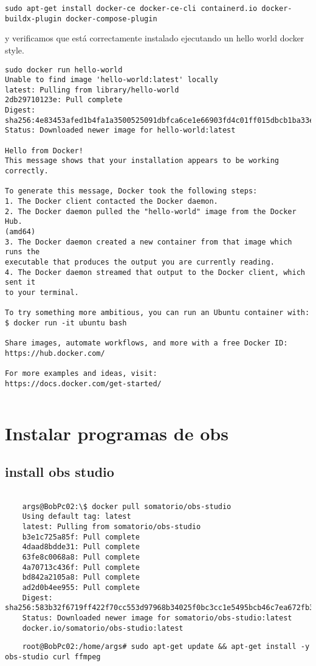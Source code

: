 \documentclass[../main.tex]{subfiles}
\begin{document}
\begin{lstlisting}
sudo apt-get install docker-ce docker-ce-cli containerd.io docker-buildx-plugin docker-compose-plugin 
\end{lstlisting}
y verificamos que está correctamente instalado ejecutando un hello world docker style.
\begin{lstlisting} 
sudo docker run hello-world
Unable to find image 'hello-world:latest' locally
latest: Pulling from library/hello-world
2db29710123e: Pull complete 
Digest: sha256:4e83453afed1b4fa1a3500525091dbfca6ce1e66903fd4c01ff015dbcb1ba33e
Status: Downloaded newer image for hello-world:latest

Hello from Docker!
This message shows that your installation appears to be working correctly.

To generate this message, Docker took the following steps:
1. The Docker client contacted the Docker daemon.
2. The Docker daemon pulled the "hello-world" image from the Docker Hub.
(amd64)
3. The Docker daemon created a new container from that image which runs the
executable that produces the output you are currently reading.
4. The Docker daemon streamed that output to the Docker client, which sent it
to your terminal.

To try something more ambitious, you can run an Ubuntu container with:
$ docker run -it ubuntu bash

Share images, automate workflows, and more with a free Docker ID:
https://hub.docker.com/

For more examples and ideas, visit:
https://docs.docker.com/get-started/

\end{lstlisting}

\begin{lstlisting} 
\end{lstlisting}
\section{Instalar programas de obs}
\subsection{install obs studio}
\begin{lstlisting}
	
	args@BobPc02:\$ docker pull somatorio/obs-studio
	Using default tag: latest
	latest: Pulling from somatorio/obs-studio
	b3e1c725a85f: Pull complete 
	4daad8bdde31: Pull complete 
	63fe8c0068a8: Pull complete 
	4a70713c436f: Pull complete 
	bd842a2105a8: Pull complete 
	ad2d0b4ee955: Pull complete 
	Digest: sha256:583b32f6719ff422f70cc553d97968b34025f0bc3cc1e5495bcb46c7ea672fb3
	Status: Downloaded newer image for somatorio/obs-studio:latest
	docker.io/somatorio/obs-studio:latest
\end{lstlisting}

\begin{lstlisting}
	root@BobPc02:/home/args# sudo apt-get update && apt-get install -y obs-studio curl ffmpeg
\end{lstlisting}
\end{document}
